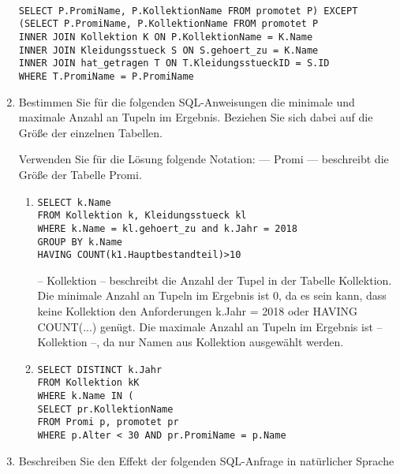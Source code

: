 \documentclass{lehramt-informatik-aufgabe}
\begin{document}
\begin{enumerate}
\begin{liAntwort}
\begin{verbatim}

SELECT P.PromiName, P.KollektionName FROM promotet P) EXCEPT
(SELECT P.PromiName, P.KollektionName FROM promotet P
INNER JOIN Kollektion K ON P.KollektionName = K.Name
INNER JOIN Kleidungsstueck S ON S.gehoert_zu = K.Name
INNER JOIN hat_getragen T ON T.KleidungsstueckID = S.ID
WHERE T.PromiName = P.PromiName
\end{verbatim}
\end{liAntwort}


\item Bestimmen Sie für die folgenden SQL-Anweisungen die minimale und
maximale Anzahl an Tupeln im Ergebnis. Beziehen Sie sich dabei auf die
Größe der einzelnen Tabellen.

Verwenden Sie für die Lösung folgende Notation:
— Promi — beschreibt die Größe der Tabelle Promi.

\begin{enumerate}


\item

\begin{verbatim}
SELECT k.Name
FROM Kollektion k, Kleidungsstueck kl
WHERE k.Name = kl.gehoert_zu and k.Jahr = 2018
GROUP BY k.Name
HAVING COUNT(k1.Hauptbestandteil)>10
\end{verbatim}

\begin{liAntwort}
-- Kollektion -- beschreibt die Anzahl der Tupel in der Tabelle
Kollektion. Die minimale Anzahl an Tupeln im Ergebnis ist 0, da es sein
kann, dass keine Kollektion den Anforderungen k.Jahr = 2018 oder HAVING
COUNT(...) genügt. Die maximale Anzahl an Tupeln im Ergebnis ist --
Kollektion --, da nur Namen aus Kollektion ausgewählt werden.
\end{liAntwort}


\item

\begin{verbatim}
SELECT DISTINCT k.Jahr
FROM Kollektion kK
WHERE k.Name IN (
SELECT pr.KollektionName
FROM Promi p, promotet pr
WHERE p.Alter < 30 AND pr.PromiName = p.Name
\end{verbatim}
\end{enumerate}


\item Beschreiben Sie den Effekt der folgenden SQL-Anfrage in
natürlicher Sprache


\end{enumerate}
\end{document}
